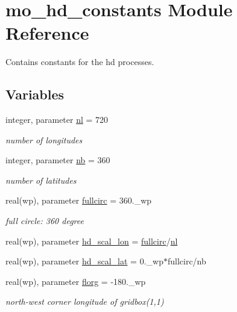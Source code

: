 \hypertarget{namespacemo__hd__constants}{}\section{mo\+\_\+hd\+\_\+constants Module Reference}
\label{namespacemo__hd__constants}


Contains constants for the hd processes.  


\subsection*{Variables}
\begin{DoxyCompactItemize}
\item 
integer, parameter \hyperlink{namespacemo__hd__constants_a9be972e3a7c772eb94e17e1d538f418c}{nl} = 720
\begin{DoxyCompactList}\small\item\em number of longitudes \end{DoxyCompactList}\item 
integer, parameter \hyperlink{namespacemo__hd__constants_a9973287d6e85ff29b6c46662b54e256d}{nb} = 360
\begin{DoxyCompactList}\small\item\em number of latitudes \end{DoxyCompactList}\item 
real(wp), parameter \hyperlink{namespacemo__hd__constants_ad86ad4525b3aaf33c6b5a61de4a3dd77}{fullcirc} = 360.\+\_\+wp
\begin{DoxyCompactList}\small\item\em full circle\+: 360 degree \end{DoxyCompactList}\item 
real(wp), parameter \hyperlink{namespacemo__hd__constants_a11321e92ff31b590a466fb310e67da2c}{hd\+\_\+scal\+\_\+lon} = \hyperlink{namespacemo__hd__constants_ad86ad4525b3aaf33c6b5a61de4a3dd77}{fullcirc}/\hyperlink{namespacemo__hd__constants_a9be972e3a7c772eb94e17e1d538f418c}{nl}
\item 
real(wp), parameter \hyperlink{namespacemo__hd__constants_a6424c9dc04985720e8aa1960333184c7}{hd\+\_\+scal\+\_\+lat} = 0.\+\_\+wp$\ast$fullcirc/nb
\item 
real(wp), parameter \hyperlink{namespacemo__hd__constants_a92e3ff05e4400fd3ce8a5b2b051040a3}{florg} = -\/180.\+\_\+wp
\begin{DoxyCompactList}\small\item\em north-\/west corner longitude of gridbox(1,1) \end{DoxyCompactList}\item 

\end{DoxyCompactItemize}

